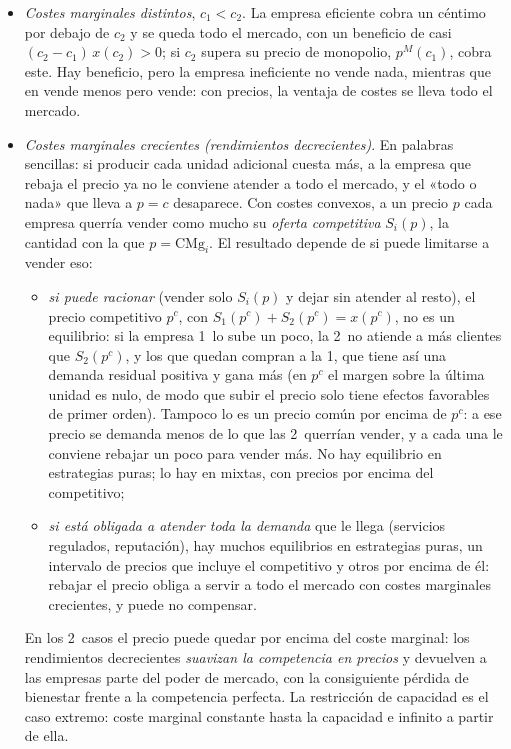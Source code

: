 \documentclass[11pt]{article}
\begin{document}
\begin{itemize}
\item \emph{Costes marginales distintos}, $c_1<c_2$. La empresa eficiente cobra un céntimo por debajo de $c_2$ y se queda todo el mercado, con un beneficio de casi $(c_2-c_1)\,x(c_2)>0$; si $c_2$ supera su precio de monopolio, $p^M(c_1)$, cobra este. Hay beneficio, pero la empresa ineficiente no vende nada, mientras que en  vende menos pero vende: con precios, la ventaja de costes se lleva todo el mercado.
\item \emph{Costes marginales crecientes (rendimientos decrecientes)}. En palabras sencillas: si producir cada unidad adicional cuesta más, a la empresa que rebaja el precio ya no le conviene atender a todo el mercado, y el «todo o nada» que lleva a $p=c$ desaparece. Con costes convexos, a un precio $p$ cada empresa querría vender como mucho su \emph{oferta competitiva} $S_i(p)$, la cantidad con la que $p=\mathrm{CMg}_i$\nocite{Vives1999Oligopoly}. El resultado depende de si puede limitarse a vender eso:
  \begin{itemize}
  \item \emph{si puede racionar} (vender solo $S_i(p)$ y dejar sin atender al resto), el precio competitivo $p^c$, con $S_1(p^c)+S_2(p^c)=x(p^c)$, no es un equilibrio: si la empresa 1~lo sube un poco, la 2~no atiende a más clientes que $S_2(p^c)$, y los que quedan compran a la 1, que tiene así una demanda residual positiva y gana más (en $p^c$ el margen sobre la última unidad es nulo, de modo que subir el precio solo tiene efectos favorables de primer orden). Tampoco lo es un precio común por encima de $p^c$: a ese precio se demanda menos de lo que las 2~querrían vender, y a cada una le conviene rebajar un poco para vender más. No hay equilibrio en estrategias puras; lo hay en mixtas, con precios por encima del competitivo;
  \item \emph{si está obligada a atender toda la demanda} que le llega (servicios regulados, reputación), hay muchos equilibrios en estrategias puras, un intervalo de precios que incluye el competitivo y otros por encima de él: rebajar el precio obliga a servir a todo el mercado con costes marginales crecientes, y puede no compensar\nocite{Dastidar1995Existence}.
  \end{itemize}
  En los 2~casos el precio puede quedar por encima del coste marginal: los rendimientos decrecientes \emph{suavizan la competencia en precios} y devuelven a las empresas parte del poder de mercado, con la consiguiente pérdida de bienestar frente a la competencia perfecta. La restricción de capacidad es el caso extremo: coste marginal constante hasta la capacidad e infinito a partir de ella.

\end{itemize}
\end{document}
